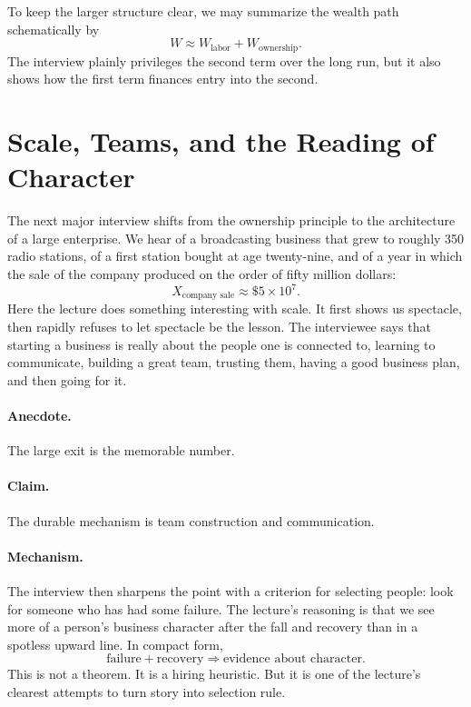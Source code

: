 To keep the larger structure clear, we may summarize the wealth path schematically by
\begin{equation}
W \approx W_{\text{labor}} + W_{\text{ownership}}.
\end{equation}
The interview plainly privileges the second term over the long run, but it also shows how the first term finances entry into the second.

\section{Scale, Teams, and the Reading of Character}

The next major interview shifts from the ownership principle to the architecture of a large enterprise. We hear of a broadcasting business that grew to roughly 350 radio stations, of a first station bought at age twenty-nine, and of a year in which the sale of the company produced on the order of fifty million dollars:
\begin{equation}
X_{\text{company sale}} \approx \$5\times 10^{7}.
\end{equation}
Here the lecture does something interesting with scale. It first shows us spectacle, then rapidly refuses to let spectacle be the lesson. The interviewee says that starting a business is really about the people one is connected to, learning to communicate, building a great team, trusting them, having a good business plan, and then going for it.

\paragraph{Anecdote.}
The large exit is the memorable number.

\paragraph{Claim.}
The durable mechanism is team construction and communication.

\paragraph{Mechanism.}
The interview then sharpens the point with a criterion for selecting people: look for someone who has had some failure. The lecture's reasoning is that we see more of a person's business character after the fall and recovery than in a spotless upward line. In compact form,
\begin{equation}
\text{failure} + \text{recovery} \Longrightarrow \text{evidence about character}.
\end{equation}
This is not a theorem. It is a hiring heuristic. But it is one of the lecture's clearest attempts to turn story into selection rule.

